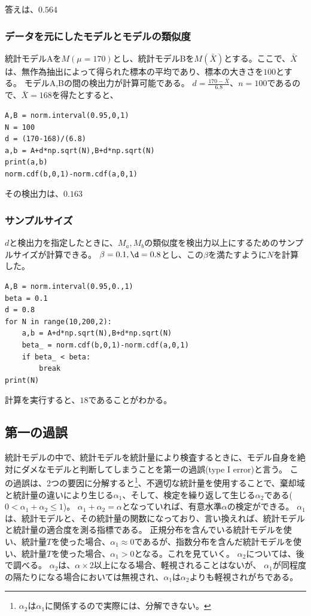 答えは、$0.564$

\subsubsection{データを元にしたモデルとモデルの類似度}
統計モデルAを$M(\mu=170)$とし、統計モデルBを$M(\bar{X})$とする。ここで、$\bar{X}$は、無作為抽出によって得られた標本の平均であり、標本の大きさを$100$とする。
モデルA,Bの間の検出力が計算可能である。
$d=\frac{170-\bar{X}}{6.8}$、$n=100$であるので、$\bar{X}=168$を得たとすると、
\begin{lstlisting}
A,B = norm.interval(0.95,0,1)
N = 100
d = (170-168)/(6.8)
a,b = A+d*np.sqrt(N),B+d*np.sqrt(N)
print(a,b)
norm.cdf(b,0,1)-norm.cdf(a,0,1)
\end{lstlisting}
その検出力は、$0.163$

\subsubsection{サンプルサイズ}
$d$と検出力を指定したときに、$M_a,M_b$の類似度を検出力以上にするためのサンプルサイズが計算できる。
$\beta=0.1,\d=0.8$とし、この$\beta$を満たすように$N$を計算した。

\begin{lstlisting}
A,B = norm.interval(0.95,0.,1)
beta = 0.1
d = 0.8
for N in range(10,200,2):
    a,b = A+d*np.sqrt(N),B+d*np.sqrt(N)
    beta_ = norm.cdf(b,0,1)-norm.cdf(a,0,1)
    if beta_ < beta:
        break
print(N)
\end{lstlisting}
計算を実行すると、$18$であることがわかる。


\subsection{第一の過誤}
統計モデルの中で、統計モデルを統計量により検査するときに、モデル自身を絶対にダメなモデルと判断してしまうことを第一の過誤(type I error)と言う。
この過誤は、2つの要因に分解すると\footnote{$\alpha_2$は$\alpha_1$に関係するので実際には、分解できない。}、不適切な統計量を使用することで、棄却域と統計量の違いにより生じる$\alpha_1$、そして、検定を繰り返して生じる$\alpha_2$である($0<\alpha_1+\alpha_2 \leq 1$)。
$\alpha_1+\alpha_2=\alpha$となっていれば、有意水準$\alpha$の検定ができる。
$\alpha_1$は、統計モデルと、その統計量の関数になっており、言い換えれば、統計モデルと統計量の適合度を測る指標である。
正規分布を含んでいる統計モデルを使い、統計量$T$を使った場合、$\alpha_1 \approx	 0 $であるが、指数分布を含んだ統計モデルを使い、統計量$T$を使った場合、$\alpha_1 > 0$となる。これを見ていく。
$\alpha_2$については、後で調べる。
$\alpha_2$は、$\alpha\times 2$以上になる場合、軽視されることはないが、
$\alpha_1$が同程度の隔たりになる場合においては無視され、$\alpha_1$は$\alpha_2$よりも軽視されがちである。

